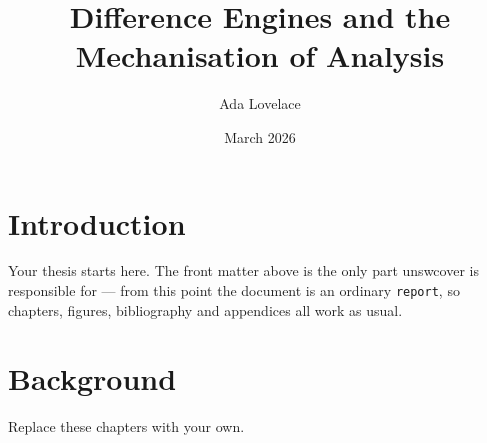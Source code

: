 \documentclass[11pt,a4paper,oneside]{report}
\title{Difference Engines and the Mechanisation of Analysis}
\author{Ada Lovelace}
\date{March 2026}
\newcommand{\crestplaceholder}{%
  \framebox[3cm]{\parbox[c][3cm][c]{2.6cm}{\centering\sffamily\scriptsize
    YOUR\\INSTITUTION\\CREST}}%
}
\begin{document}
\begingroup
\renewcommand{\includegraphics}[2][]{\crestplaceholder}
\makeunswfrontmatter
\endgroup


\tableofcontents

\chapter{Introduction}
Your thesis starts here. The front matter above is the only part unswcover is
responsible for --- from this point the document is an ordinary \texttt{report},
so chapters, figures, bibliography and appendices all work as usual.

\chapter{Background}
Replace these chapters with your own.
\end{document}
